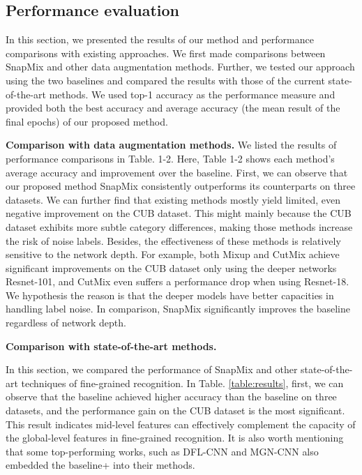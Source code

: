 \documentclass[letterpaper]{article} \usepackage{aaai21}  \usepackage{times}  \usepackage{helvet} \usepackage{courier}  \usepackage[hyphens]{url}  \usepackage{graphicx} \urlstyle{rm} \def\UrlFont{\rm}  \usepackage{natbib}  \usepackage{caption} \frenchspacing  \setlength{\pdfpagewidth}{8.5in}  \setlength{\pdfpageheight}{11in}
\begin{document}
\subsection{Performance evaluation}
In this section, we presented the results of our method and performance comparisons with existing approaches. We first made comparisons between SnapMix and other data augmentation methods.  Further, we tested our approach using the two baselines and compared the results with those of the current state-of-the-art methods. We used top-1 accuracy as the performance measure and provided both the best accuracy and average accuracy (the mean result of the final  epochs) of our proposed method.


\noindent\textbf{Comparison with data augmentation methods.}
We listed the results of performance comparisons in Table. 1-2. Here, Table 1-2 shows each method's average accuracy and improvement over the baseline. First, we can observe that our proposed method SnapMix consistently outperforms its counterparts on three datasets. We can further find that existing methods mostly yield limited, even negative improvement on the CUB dataset. This might mainly because the CUB dataset exhibits more subtle category differences, making those methods increase the risk of noise labels. Besides, the effectiveness of these methods is relatively sensitive to the network depth. For example,  both Mixup and CutMix achieve significant improvements on the CUB dataset only using the deeper networks Resnet-101, and CutMix even suffers a performance drop when using Resnet-18.  We hypothesis the reason is that the deeper models have better capacities in handling label noise. In comparison,  SnapMix significantly improves the baseline regardless of network depth.


\noindent\textbf{Comparison with state-of-the-art methods.}

In this section, we compared the performance of SnapMix and other state-of-the-art techniques of fine-grained recognition.  In Table. \ref{table:results},  first, we can observe that the baseline achieved higher accuracy than the baseline on three datasets, and the performance gain on the CUB dataset is the most significant. This result indicates mid-level features can effectively complement the capacity of the global-level features in fine-grained recognition. It is also worth mentioning that some top-performing works, such as DFL-CNN \cite{wang2018learning} and MGN-CNN \cite{zhang2019learning} also embedded the baseline+ into their methods. 
\end{document}
